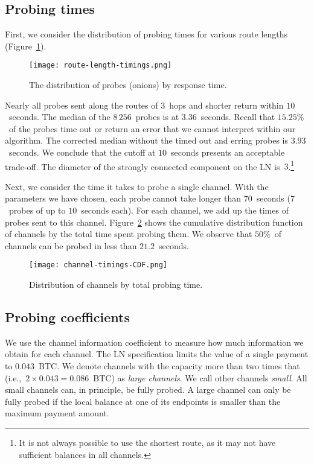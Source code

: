 \subsection{Probing times}

First, we consider the distribution of probing times for various route lengths (Figure~\ref{fig:route-length-timings}).

\begin{figure}[ht]
	\centering
	\texttt{[image: route-length-timings.png]}
	\caption{The distribution of probes (onions) by response time.}
	\label{fig:route-length-timings}
\end{figure}

Nearly all probes sent along the routes of $3$~hops and shorter return within $10$~seconds.
The median of the $8\,256$~probes is at $3.36$~seconds.
Recall that $15.25\%$~of the probes time out or return an error that we cannot interpret within our algorithm.
The corrected median without the timed out and erring probes is $3.93$~seconds. 
We conclude that the cutoff at $10$~seconds presents an acceptable trade-off.
The diameter of the strongly connected component on the LN is~$3$.\footnote{It is not always possible to use the shortest route, as it may not have sufficient balances in all channels.}

Next, we consider the time it takes to probe a single channel.
With the parameters we have chosen, each probe cannot take longer than $70$~seconds ($7$~probes of up to $10$~seconds each).
For each channel, we add up the times of probes sent to this channel.
Figure~\ref{fig:channel-timings-CDF} shows the cumulative distribution function of channels by the total time spent probing them.
We observe that $50\%$~of channels can be probed in less than $21.2$~seconds.

\begin{figure}[ht]
	\centering
	\texttt{[image: channel-timings-CDF.png]}
	\caption{Distribution of channels by total probing time.}
	\label{fig:channel-timings-CDF}
\end{figure}


\subsection{Probing coefficients}

We use the channel information coefficient to measure how much information we obtain for each channel.
The LN specification limits the value of a single payment to $0.043$~BTC\@.
We denote channels with the capacity more than two times that (i.e.,~$2 \times 0.043 = 0.086$~BTC) as \textit{large channels}.
We call other channels \textit{small}.
All small channels can, in principle, be fully probed.
A large channel can only be fully probed if the local balance at one of its endpoints is smaller than the maximum payment amount.

